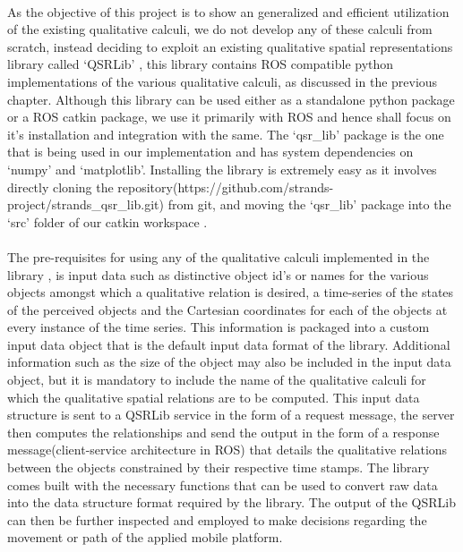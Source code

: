 \paragraph{}As the objective of this project is to show an generalized and efficient utilization of the existing qualitative calculi, we do not develop any of these calculi from scratch, instead deciding to exploit an existing qualitative spatial representations library called `QSRLib' \cite{gatsoulis2016qsrlib}, this library contains ROS compatible  python implementations of the various qualitative calculi, as discussed in the previous chapter. Although this library can be used either as a standalone python package or a ROS catkin package, we use it primarily with ROS and hence shall focus on it's installation and integration with the same. The `qsr\_lib' package is the one that is being used in our implementation and has system dependencies on `numpy' and `matplotlib'. Installing the library is extremely easy as it involves directly cloning the repository(https://github.com/strands-project/strands\_qsr\_lib.git) from git, and moving the `qsr\_lib' package into the `src' folder of our catkin workspace \cite{qsrlib}. 

\paragraph{}The pre-requisites for using any of the qualitative calculi implemented in the library \cite{qsrlib}, \cite{gatsoulis2016qsrlib} is input data such as distinctive object id's or names for the various objects amongst which a qualitative relation is desired, a time-series of the states of the perceived objects and the Cartesian coordinates for each of the objects at every instance of the time series. This information is packaged into a custom input data object that is the default input data format of the library. Additional information such as the size of the object may also be included in the input data object, but it is mandatory to include the name of the qualitative calculi for which the qualitative spatial relations are to be computed. This input data structure is sent to a QSRLib service in the form of a request message, the server then computes the relationships and send the output in the form of a response message(client-service architecture in ROS) that details the qualitative relations between the objects constrained by their respective time stamps. The library comes built with the necessary functions that can be used to convert raw data into the data structure format required by the library. The output of the QSRLib can then be further inspected and employed to make decisions regarding the movement or path of the applied mobile platform.

